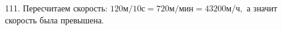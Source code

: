 111. Пересчитаем скорость: $120\text{м}/10\text{с}=720\text{м}/\text{мин}=43200\text{м}/\text{ч},$ а значит скорость была превышена.\\
